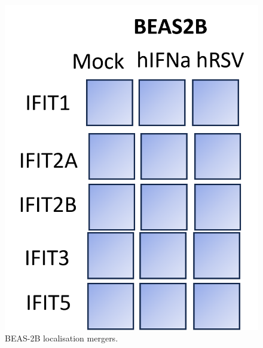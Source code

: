 \begin{figure}
    \centering
    \includegraphics[width=1\linewidth]{06. Chapter 1/Figs/02. Localisation/03. beas2b merges.png}
    \caption[BEAS-2B localisation mergers.]{BEAS-2B localisation mergers.}
    \label{BEAS-2B localisation mergers.}
\end{figure}


